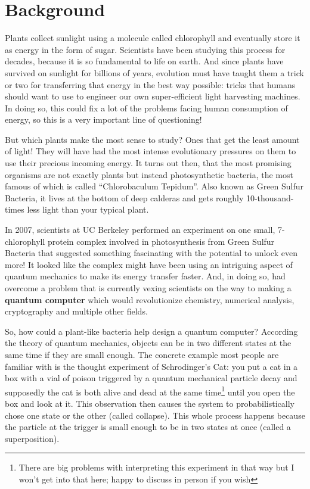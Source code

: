 \section{Background}
Plants collect sunlight using a molecule called chlorophyll and eventually store it as energy in the form of sugar.  Scientists have been studying this process for decades, because it is so fundamental to life on earth.   And since plants have survived on sunlight for billions of years, evolution must have taught them a trick or two for transferring that energy in the best way possible: tricks that humans should want to use to engineer our own super-efficient light harvesting machines.  In doing so, this could fix a lot of the problems facing human consumption of energy, so this is a very important line of questioning!

But which plants make the most sense to study?  Ones that get the least amount of light!  They will have had the most intense evolutionary pressures on them to use their precious incoming energy.   It turns out then, that the most promising organisms are not exactly plants but instead photosynthetic bacteria, the most famous of which is called ``Chlorobaculum Tepidum''.  Also known as Green Sulfur Bacteria, it lives at the bottom of deep calderas and gets roughly 10-thousand-times less light than your typical plant.

In 2007, scientists at UC Berkeley\cite{FMO1} performed an experiment on one small, 7-chlorophyll protein complex involved in photosynthesis from Green Sulfur Bacteria that suggested something fascinating with the potential to unlock even more!  It looked like the complex might have been using an intriguing aspect of quantum mechanics to make its energy transfer faster.  And, in doing so, had overcome a problem that is currently vexing scientists on the way to making a \textbf{quantum computer} which would revolutionize chemistry, numerical analysis, cryptography and multiple other fields.

So, how could a plant-like bacteria help design a quantum computer?  According the theory of quantum mechanics, objects can be in two different states at the same time if they are small enough.  The concrete example most people are familiar with is the thought experiment of Schrodinger's Cat: you put a cat in a box with a vial of poison triggered by a quantum mechanical particle decay and supposedly the cat is both alive and dead at the same time\footnote{There are big problems with interpreting this experiment in that way but I won't get into that here; happy to discuss in person if you wish} until you open the box and look at it.  This observation then causes the system to probabilistically chose one state or the other (called collapse).  This whole process happens because the particle at the trigger is small enough to be in two states at once (called a superposition).

